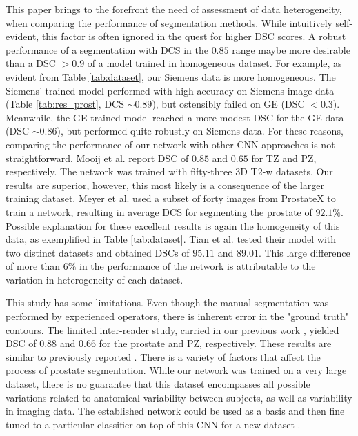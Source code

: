 This paper brings to the forefront the need of assessment of data heterogeneity, when comparing the performance of segmentation methods. While intuitively self-evident, this factor is often ignored in the quest for higher DSC scores. A robust performance of a segmentation with DCS in the $0.85$ range maybe more desirable than a DSC $> 0.9$ of a model trained in homogeneous dataset. For example, as evident from Table \ref{tab:dataset}, our Siemens data is more homogeneous. The Siemens' trained model performed with high accuracy on Siemens image data (Table \ref{tab:res_prost}, DCS $\sim0.89$), but ostensibly failed on GE (DSC $< 0.3$). Meanwhile, the GE trained model reached a more modest DSC for the GE data (DSC $\sim0.86$), but performed quite robustly on Siemens data. 
For these reasons, comparing the performance of our network with other CNN approaches is not straightforward. Mooij et al. \cite{mooij_automatic_2018} report DSC of $0.85$ and $0.65$ for TZ and PZ, respectively. The network was trained with fifty-three 3D T2-w datasets. Our results are superior, however, this most likely is a consequence of the larger training dataset. Meyer et al. \cite{anneke} used a subset of forty images from ProstateX to train a network, resulting in average DCS for segmenting the prostate of $92.1\%$. Possible explanation for these excellent results is again the homogeneity of this data, as exemplified in Table \ref{tab:dataset}. Tian et al. \cite{to2018deep} tested their model with two distinct datasets and obtained DSCs of $95.11$ and $89.01$. This large difference of more than $6\%$ in the performance of the network is attributable to the variation in heterogeneity of each dataset. 

This study has some limitations. Even though the manual segmentation was performed by experienced operators, there is inherent error in the "ground truth" contours. The limited inter-reader study, carried in our previous work \cite{deukwoo_classification_2018}, yielded DSC of $0.88$ and $0.66$ for the prostate and PZ, respectively. These results are similar to previously reported \cite{4_klein2008automatic}. There is a variety of factors that affect the process of prostate segmentation. While our network was trained on a very large dataset, there is no guarantee that this dataset encompasses all possible variations related to anatomical variability between subjects, as well as variability in imaging data. The established network could be used as a basis and then fine tuned to a particular classifier on top of this CNN for a new dataset \cite{tajbakhsh2016convolutional}.
